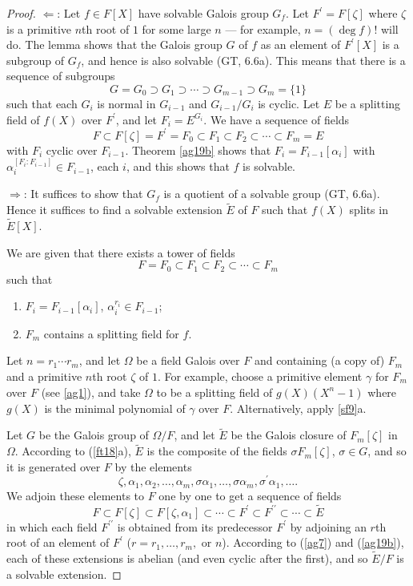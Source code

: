 \documentclass[a4paper,11pt,final,openany]{memoir}
\theoremstyle{nonumberplain}
\newtheorem{proof}{Proof.}
\begin{document}
\begin{proof}
$\Longleftarrow$: Let $f\in F[X]$ have solvable Galois group $G_{f}$. Let
$F^{\prime}=F[\zeta]$ where $\zeta$ is a primitive $n$th root of $1$ for some
large $n$ --- for example, $n=(\deg f)!$ will do. The lemma shows that the
Galois group $G$ of $f$ as an element of $F^{\prime}[X]$ is a subgroup of
$G_{f}$, and hence is also solvable (GT, 6.6a). This means that
there is a sequence of subgroups
\[
G=G_{0}\supset G_{1}\supset\cdots\supset G_{m-1}\supset G_{m}=\{1\}
\]
such that each $G_{i}$ is normal in $G_{i-1}$ and $G_{i-1}/G_{i}$ is cyclic.
Let $E$ be a splitting field of $f(X)$ over $F^{\prime}$, and let
$F_{i}=E^{G_{i}}$. We have a sequence of fields
\[
F\subset F[\zeta]=F^{\prime}=F_{0}\subset F_{1}\subset F_{2}\subset
\cdots\subset F_{m}=E
\]
with $F_{i}$ cyclic over $F_{i-1}$. Theorem \ref{ag19b} shows that
$F_{i}=F_{i-1}[\alpha_{i}]$ with $\alpha_{i}^{[F_{i}\colon F_{i-1}]}\in
F_{i-1}$, each $i$, and this shows that $f$ is solvable.

$\Longrightarrow$: It suffices to show that $G_{f}$ is a quotient of a
solvable group (GT, 6.6a). Hence it suffices to find a solvable
extension $\tilde{E}$ of $F$ such that $f(X)$ splits in $\tilde{E}[X]$.

We are given that there exists a tower of fields%
\[
F=F_{0}\subset F_{1}\subset F_{2}\subset\cdots\subset F_{m}%
\]
such that

\begin{enumerate}
\item $F_{i}=F_{i-1}[\alpha_{i}]$, $\alpha_{i}^{r_{i}}\in F_{i-1}$;

\item $F_{m}$ contains a splitting field for $f.$
\end{enumerate}

Let $n=r_{1}\cdots r_{m}$, and let $\Omega$ be a field Galois over $F$ and
containing (a copy of) $F_{m}$ and a primitive $n$th root $\zeta$ of $1.$ For
example, choose a primitive element $\gamma$ for $F_{m}\ $over $F$ (see
\ref{ag1}), and take $\Omega$ to be a splitting field of $g(X)(X^{n}-1)$ where
$g(X)$ is the minimal polynomial of $\gamma$ over $F$. Alternatively, apply
\ref{sf9}a.

Let $G$ be the Galois group of $\Omega/F$, and let $\tilde{E}$ be the Galois
closure of $F_{m}[\zeta]$ in $\Omega$. According to (\ref{ft18}a), $\tilde{E}$
is the composite of the fields $\sigma F_{m}[\zeta]$, $\sigma\in G$, and so it
is generated over $F$ by the elements
\[
\zeta,\alpha_{1},\alpha_{2},\ldots,\alpha_{m},\sigma\alpha_{1},\ldots
,\sigma\alpha_{m},\sigma^{\prime}\alpha_{1},\ldots.
\]
We adjoin these elements to $F$ one by one to get a sequence of fields
\[
F\subset F[\zeta]\subset F[\zeta,\alpha_{1}]\subset\cdots\subset F^{\prime
}\subset F^{\prime\prime}\subset\cdots\subset\tilde{E}%
\]
in which each field $F^{\prime\prime}$ is obtained from its predecessor
$F^{\prime}$ by adjoining an $r$th root of an element of $F^{\prime}$
($r=r_{1},\ldots,r_{m},$ or $n$). According to (\ref{ag7}) and (\ref{ag19b}),
each of these extensions is abelian (and even cyclic after the first), and so
$\tilde{E}/F$ is a solvable extension.
\end{proof}
\end{document}
